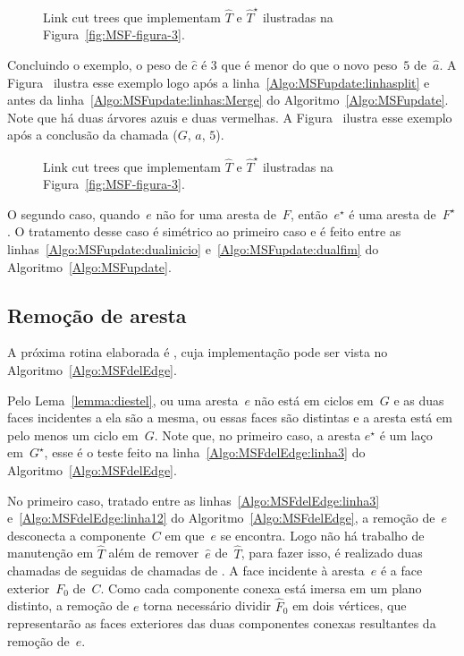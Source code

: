 \begin{figure}[htb]
\scalebox{1}{
\centering

}
\caption{Link cut trees que implementam $\hat T$ e $\hat T^\star$ ilustradas na Figura~\ref{fig:MSF-figura-3}.}
\label{fig:MSF-figura-6}
\end{figure}

Concluindo o exemplo, o peso de $\hat c$ é $3$ que é menor do que o novo peso~$5$ de~$\hat a$.
A Figura~ ilustra esse exemplo logo após a linha~\ref{Algo:MSFupdate:linhasplit} e antes da linha~\ref{Algo:MSFupdate:linhas:Merge} do Algoritmo~\ref{Algo:MSFupdate}.
Note que há duas árvores azuis e duas vermelhas.
A Figura~ ilustra esse exemplo após a conclusão da chamada \MSFupdate($G$, $a$, $5$).

\begin{figure}[htb]
\scalebox{1}{
\centering

}
\caption{Link cut trees que implementam $\hat T$ e $\hat T^\star$ ilustradas na Figura~\ref{fig:MSF-figura-3}.}
\label{fig:MSF-figura-7}
\end{figure}

O segundo caso, quando~$e$ não for uma aresta de~$F$, então~$e^\star$ é uma aresta de~$F^\star$.
O tratamento desse caso é simétrico ao primeiro caso e é feito entre as linhas~\ref{Algo:MSFupdate:dualinicio} e~\ref{Algo:MSFupdate:dualfim} do Algoritmo~\ref{Algo:MSFupdate}.


\subsection{Remoção de aresta}

A próxima rotina elaborada é \MSFdelEdge{}, cuja implementação pode ser vista no Algoritmo~\ref{Algo:MSFdelEdge}.

Pelo Lema~\ref{lemma:diestel}, ou uma aresta~$e$ não está em ciclos em~$G$ e as duas faces incidentes a ela são a mesma, ou essas faces são distintas e a aresta está em pelo menos um ciclo em~$G$.
Note que, no primeiro caso, a aresta $e^\star$ é um laço em~$G^\star$, esse é o teste feito na linha~\ref{Algo:MSFdelEdge:linha3} do Algoritmo~\ref{Algo:MSFdelEdge}.

No primeiro caso, tratado entre as linhas~\ref{Algo:MSFdelEdge:linha3} e~\ref{Algo:MSFdelEdge:linha12} do Algoritmo~\ref{Algo:MSFdelEdge}, a remoção de~$e$ desconecta a componente~$C$ em que~$e$ se encontra.
Logo não há trabalho de manutenção em $\hat T$ além de remover~$\hat e$ de~$\hat T$, para fazer isso, é realizado 
duas chamadas de \LCOCycle{} seguidas de chamadas de \LCOSplit{}.
A face incidente à aresta~$e$ é a face exterior~$F_0$ de~$C$.
Como cada componente conexa está imersa em um plano distinto, a remoção de $e$ torna necessário dividir $\hat F_0$ em dois vértices, que representarão as faces exteriores das duas componentes conexas resultantes da remoção de~$e$.


